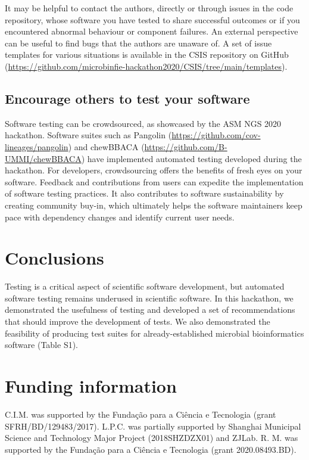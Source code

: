 It may be helpful to contact the authors, directly or through issues in the code repository, whose software you have tested to share successful outcomes or if you encountered abnormal behaviour or component failures. An external perspective can be useful to find bugs that the authors are unaware of. A set of issue templates for various situations is available in the CSIS repository on GitHub (\url{https://github.com/microbinfie-hackathon2020/CSIS/tree/main/templates}).

\subsection{Encourage others to test your software}

Software testing can be crowdsourced, as showcased by the ASM NGS 2020 hackathon. Software suites such as Pangolin (\url{https://github.com/cov-lineages/pangolin}) \cite{otoole_assignment_2021} and chewBBACA (\url{https://github.com/B-UMMI/chewBBACA}) \cite{silva_chewbbaca_nodate} have implemented automated testing developed during the hackathon. For developers, crowdsourcing offers the benefits of fresh eyes on your software. Feedback and contributions from users can expedite the implementation of software testing practices. It also contributes to software sustainability by creating community buy-in, which ultimately helps the software maintainers keep pace with dependency changes and identify current user needs.

\section{Conclusions}
 
Testing is a critical aspect of scientific software development, but automated software testing remains underused in scientific software. In this hackathon, we demonstrated the usefulness of testing and developed a set of recommendations that should improve the development of tests. We also demonstrated the feasibility of producing test suites for already-established microbial bioinformatics software (Table S1).

 
\section{Funding information}
 
C.I.M. was supported by the Fundação para a Ciência e Tecnologia (grant SFRH/BD/129483/2017). L.P.C. was partially supported by Shanghai Municipal Science and Technology Major Project (2018SHZDZX01) and ZJLab. R. M. was supported by the Fundação para a Ciência e Tecnologia (grant 2020.08493.BD).

